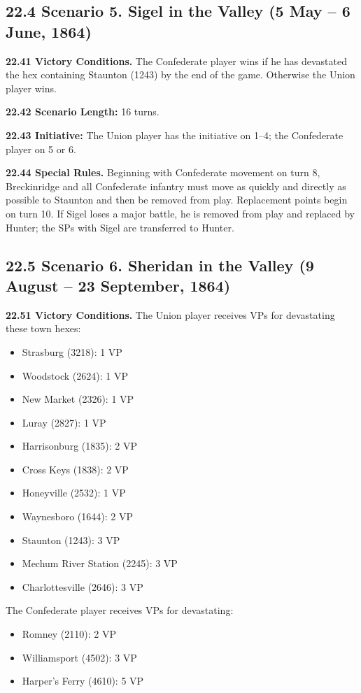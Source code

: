 \subsection[22.4 Scenario 5. Sigel in the Valley]{22.4 Scenario 5. Sigel in the Valley (5 May -- 6 June, 1864)}

\textbf{22.41 Victory Conditions.} The Confederate player wins if he has devastated the hex containing Staunton (1243) by the end of the game. Otherwise the Union player wins.

\textbf{22.42 Scenario Length:} 16 turns.

\textbf{22.43 Initiative:} The Union player has the initiative on 1--4; the Confederate player on 5 or 6.

\textbf{22.44 Special Rules.} Beginning with Confederate movement on turn 8, Breckinridge and all Confederate infantry must move as quickly and directly as possible to Staunton and then be removed from play. Replacement points begin on turn 10. If Sigel loses a major battle, he is removed from play and replaced by Hunter; the SPs with Sigel are transferred to Hunter.

\subsection[22.5 Scenario 6. Sheridan in the Valley]{22.5 Scenario 6. Sheridan in the Valley (9 August -- 23 September, 1864)}

\textbf{22.51 Victory Conditions.} The Union player receives VPs for devastating these town hexes:
\begin{itemize}
\item Strasburg (3218): 1 VP
\item Woodstock (2624): 1 VP
\item New Market (2326): 1 VP
\item Luray (2827): 1 VP
\item Harrisonburg (1835): 2 VP
\item Cross Keys (1838): 2 VP
\item Honeyville (2532): 1 VP
\item Waynesboro (1644): 2 VP
\item Staunton (1243): 3 VP
\item Mechum River Station (2245): 3 VP
\item Charlottesville (2646): 3 VP
\end{itemize}

The Confederate player receives VPs for devastating:
\begin{itemize}
\item Romney (2110): 2 VP
\item Williamsport (4502): 3 VP
\item Harper's Ferry (4610): 5 VP
\end{itemize}

